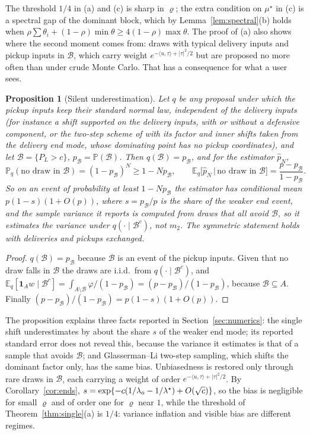 \documentclass[11pt]{article}
\newtheorem{proposition}{Proposition}
\theoremstyle{definition}
\theoremstyle{remark}
\newcommand{\E}{\mathbb{E}}
\renewcommand{\P}{\mathbb{P}}
\newcommand{\one}{\mathbf{1}}
\newcommand{\ip}[2]{\langle #1,#2\rangle}
\begin{document}
The threshold $1/4$ in (a) and (c) is sharp in $\varrho$; the extra condition on
$\mu^\star$ in (c) is a spectral gap of the dominant block, which by
Lemma~\ref{lem:spectral}(b) holds when
$\rho\sum\theta_i+(1-\rho)\min\theta\ge4(1-\rho)\max\theta$. The proof of (a) also shows
where the second moment comes from: draws with typical delivery inputs and pickup inputs in
$\mathcal{B}$, which carry weight $e^{-\ip u\tau+|\tau|^2/2}$ but are proposed no more often than
under crude Monte Carlo. That has a consequence for what a user sees.

\begin{proposition}[Silent underestimation]\label{prop:silent}
Let $q$ be any proposal under which the pickup inputs keep their standard normal law,
independent of the delivery inputs (for instance a shift supported on the delivery
inputs, with or without a defensive component, or the two-step scheme of
\citet{GlassermanLi2005} with its factor and inner shifts taken from the delivery end
mode, whose dominating point has no pickup coordinates), and let
$\mathcal{B}=\{P_L>c\}$, $p_{\mathcal{B}}=\P(\mathcal{B})$. Then $q(\mathcal{B})=p_{\mathcal{B}}$, and for the estimator $\hat p_N$,
\[
\P_q(\text{no draw in }\mathcal{B})=(1-p_{\mathcal{B}})^N\ge1-Np_{\mathcal{B}},\qquad
\E_q\big[\hat p_N\,\big|\,\text{no draw in }\mathcal{B}\big]=\frac{p-p_{\mathcal{B}}}{1-p_{\mathcal{B}}}.
\]
So on an event of probability at least $1-Np_{\mathcal{B}}$ the estimator has conditional mean
$p(1-s)(1+O(p))$, where $s=p_{\mathcal{B}}/p$ is the share of the weaker end event, and the
sample variance it reports is computed from draws that all avoid $\mathcal{B}$, so it estimates the
variance under $q(\cdot\mid \mathcal{B}^c)$, not $m_2$. The symmetric statement holds with
deliveries and pickups exchanged.
\end{proposition}

\begin{proof}
$q(\mathcal{B})=p_{\mathcal{B}}$ because $\mathcal{B}$ is an event of the pickup inputs. Given that no draw falls in
$\mathcal{B}$ the draws are i.i.d.\ from $q(\cdot\mid \mathcal{B}^c)$, and
$\E_q[\one_Aw\mid \mathcal{B}^c]=\int_{A\setminus \mathcal{B}}\varphi\big/(1-p_{\mathcal{B}})=(p-p_{\mathcal{B}})/(1-p_{\mathcal{B}})$, because
$\mathcal{B}\subseteq A$. Finally $(p-p_{\mathcal{B}})/(1-p_{\mathcal{B}})=p(1-s)(1+O(p))$.
\end{proof}

The proposition explains three facts reported in Section~\ref{sec:numerics}: the single
shift underestimates by about the share $s$ of the weaker end mode; its reported standard
error does not reveal this, because the variance it estimates is that of a sample that
avoids $\mathcal{B}$; and Glasserman--Li two-step sampling, which shifts the dominant factor only,
has the same bias. Unbiasedness is restored only through rare draws in $\mathcal{B}$, each
carrying a weight of order $e^{-\ip u\tau+|\tau|^2/2}$. By Corollary~\ref{cor:ends},
$s=\exp\{-c(1/\lambda_{\rm o}-1/\lambda^\star)+O(\sqrt c)\}$, so the bias is negligible
for small $\varrho$ and of order one for $\varrho$ near $1$, while the threshold of
Theorem~\ref{thm:single}(a) is $1/4$: variance inflation and visible bias are different
regimes.
\end{document}
